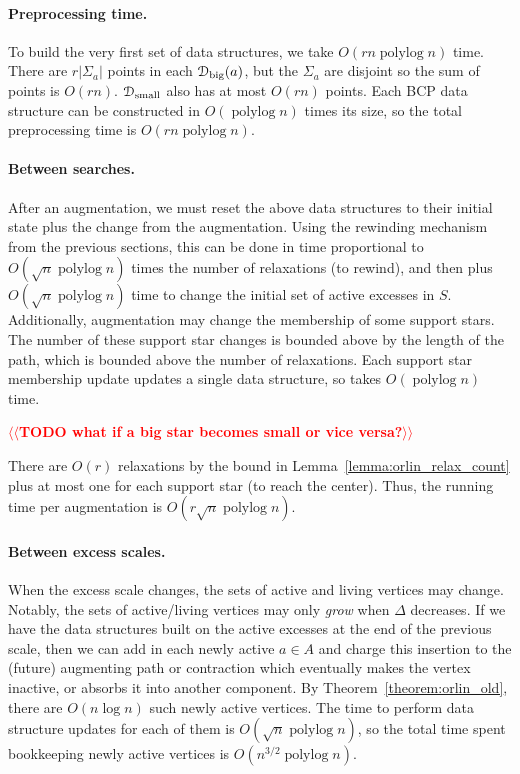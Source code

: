 \documentclass[11pt]{article}
\makeatletter
\def\polylog{\mathop{\mathrm{polylog}}}
\def\abs#1{\mathopen| #1 \mathclose|}		%
\theoremstyle{plain}
\numberwithin{figure}{section}
\def\n@te#1{\textsf{\boldmath \textbf{$\langle\!\langle$#1$\rangle\!\rangle$}}\leavevmode}
\def\note#1{\textcolor{red}{\n@te{#1}}}
\makeatother
\begin{document}
\paragraph{Preprocessing time.}
To build the very first set of data structures, we take $O(rn\polylog n)$ time.
There are $r\abs{\Sigma_a}$ points in each $\EuScript{D}_\text{big}(a)$,
but the $\Sigma_a$ are disjoint so the sum of points is $O(rn)$.
$\EuScript{D}_\text{small}$ also has at most $O(rn)$ points.
Each BCP data structure can be constructed in $O(\polylog n)$ times its size,
so the total preprocessing time is $O(rn\polylog n)$.

\paragraph{Between searches.}
After an augmentation, we must reset the above data structures to their initial
state plus the change from the augmentation.
Using the rewinding mechanism from the previous sections, this can be done in
time proportional to $O(\sqrt{n}\polylog n)$ times the number of relaxations
(to rewind), and then plus $O(\sqrt{n}\polylog n)$ time to change the initial
set of active excesses in $S$.
Additionally, augmentation may change the membership of some support stars.
The number of these support star changes is bounded above by the length of the
path, which is bounded above the number of relaxations.
Each support star membership update updates a single data structure,
so takes $O(\polylog n)$ time.

\note{TODO what if a big star becomes small or vice versa?} %

There are $O(r)$ relaxations by the bound in
Lemma~\ref{lemma:orlin_relax_count} plus at most one for each support star
(to reach the center).
Thus, the running time per augmentation is $O(r\sqrt{n}\polylog n)$.

\paragraph{Between excess scales.}
When the excess scale changes, the sets of active and living vertices may
change.
Notably, the sets of active/living vertices may only \emph{grow} when $\Delta$
decreases.
If we have the data structures built on the active excesses at the end of the
previous scale, then we can add in each newly active $a \in A$ and
charge this insertion to the (future) augmenting path or contraction which
eventually makes the vertex inactive, or absorbs it into another component.
By Theorem~\ref{theorem:orlin_old}, there are $O(n\log n)$ such newly active
vertices.
The time to perform data structure updates for each of them is
$O(\sqrt{n}\polylog n)$, so the total time spent bookkeeping newly active
vertices is $O(n^{3/2}\polylog n)$.

{


}
\end{document}
